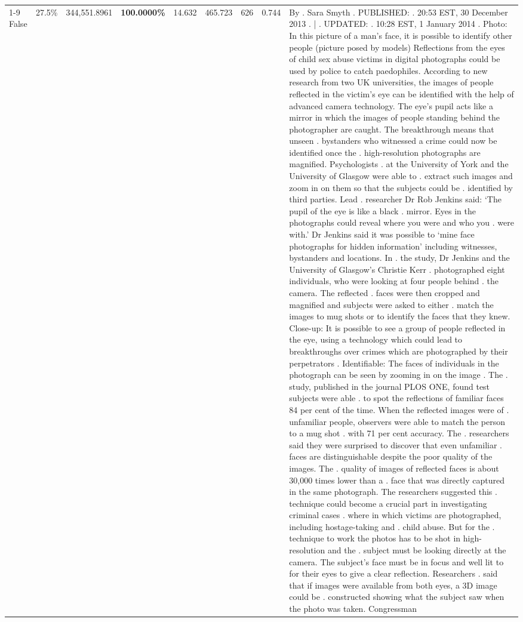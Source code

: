 \begin{table}[H]
\begin{tabular}{lllrlllll}
\cline{1-9}
False & 27.5\% & 344,551.8961 & \bfseries \color{red} 100.0000\% & 14.632 & 465.723 & 626 & 0.744 & By . Sara Smyth . PUBLISHED: . 20:53 EST, 30 December 2013 . | . UPDATED: . 10:28 EST, 1 January 2014 . Photo: In this picture of a man's face, it is possible to identify other people (picture posed by models) Reflections from the eyes of child sex abuse victims in digital photographs could be used by police to catch paedophiles. According to new research from two UK universities, the images of people reflected in the victim's eye can be identified with the help of advanced camera technology. The eye's pupil acts like a mirror in which the images of people standing behind the photographer are caught. The breakthrough means that unseen . bystanders who witnessed a crime could now be identified once the . high-resolution photographs are magnified. Psychologists . at the University of York and the University of Glasgow were able to . extract such images and zoom in on them so that the subjects could be . identified by third parties. Lead . researcher Dr Rob Jenkins said: ‘The pupil of the eye is like a black . mirror. Eyes in the photographs could reveal where you were and who you . were with.' Dr Jenkins said it was possible to ‘mine face photographs for hidden information' including witnesses, bystanders and locations. In . the study, Dr Jenkins and the University of Glasgow's Christie Kerr . photographed eight individuals, who were looking at four people behind . the camera. The reflected . faces were then cropped and magnified and subjects were asked to either . match the images to mug shots or to identify the faces that they knew. Close-up: It is possible to see a group of people reflected in the eye, using a technology which could lead to breakthroughs over crimes which are photographed by their perpetrators . Identifiable: The faces of individuals in the photograph can be seen by zooming in on the image . The . study, published in the journal PLOS ONE, found test subjects were able . to spot the reflections of familiar faces 84 per cent of the time. When the reflected images were of . unfamiliar people, observers were able to match the person to a mug shot . with 71 per cent accuracy. The . researchers said they were surprised to discover that even unfamiliar . faces are distinguishable despite the poor quality of the images. The . quality of images of reflected faces is about 30,000 times lower than a . face that was directly captured in the same photograph. The researchers suggested this . technique could become a crucial part in investigating criminal cases . where in which victims are photographed, including hostage-taking and . child abuse. But for the . technique to work the photos has to be shot in high-resolution and the . subject must be looking directly at the camera. The subject's face must be in focus and well lit to for their eyes to give a clear reflection. Researchers . said that if images were available from both eyes, a 3D image could be . constructed showing what the subject saw when the photo was taken. Congressman \\

\end{tabular}
\end{table}
